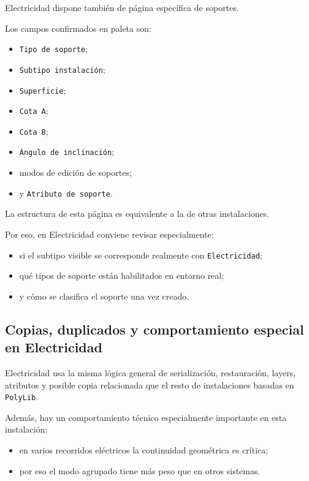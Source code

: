 Electricidad dispone también de página específica de soportes.

Los campos confirmados en paleta son:

\begin{itemize}
\item \texttt{Tipo de soporte};
\item \texttt{Subtipo instalación};
\item \texttt{Superficie};
\item \texttt{Cota A};
\item \texttt{Cota B};
\item \texttt{Ángulo de inclinación};
\item modos de edición de soportes;
\item y \texttt{Atributo de soporte}.
\end{itemize}

La estructura de esta página es equivalente a la de otras instalaciones.

Por eso, en Electricidad conviene revisar especialmente:

\begin{itemize}
\item si el subtipo visible se corresponde realmente con \texttt{Electricidad};
\item qué tipos de soporte están habilitados en entorno real;
\item y cómo se clasifica el soporte una vez creado.
\end{itemize}


\subsection{Copias, duplicados y comportamiento especial en Electricidad}

Electricidad usa la misma lógica general de serialización, restauración, layers, atributos y posible copia relacionada que el resto de instalaciones basadas en \texttt{PolyLib}.

Además, hay un comportamiento técnico especialmente importante en esta instalación:

\begin{itemize}
\item en varios recorridos eléctricos la continuidad geométrica es crítica;
\item por eso el modo agrupado tiene más peso que en otros sistemas.
\end{itemize}


